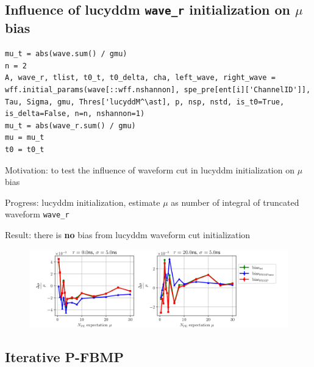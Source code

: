 \documentclass[notitlepage]{article}
\begin{document}
\subsection{Influence of lucyddm \texttt{wave\_r} initialization on $\mu$ bias}

\begin{lstlisting}
mu_t = abs(wave.sum() / gmu)
n = 2
A, wave_r, tlist, t0_t, t0_delta, cha, left_wave, right_wave = wff.initial_params(wave[::wff.nshannon], spe_pre[ent[i]['ChannelID']], Tau, Sigma, gmu, Thres['lucyddM^\ast], p, nsp, nstd, is_t0=True, is_delta=False, n=n, nshannon=1)
mu_t = abs(wave_r.sum() / gmu)
mu = mu_t
t0 = t0_t
\end{lstlisting}

Motivation: to test the influence of waveform cut in lucyddm initialization on $\mu$ bias

Progress: lucyddm initialization, estimate $\mu$ as number of integral of truncated waveform \texttt{wave\_r}

Result: there is \textbf{no} bias from lucyddm waveform cut initialization

\begin{figure}[H]
    \centering
    \includegraphics[width=\textwidth]{vs-biasmu-lucyddmwave.png}
\end{figure}

\subsection{Iterative P-FBMP}
\end{document}
